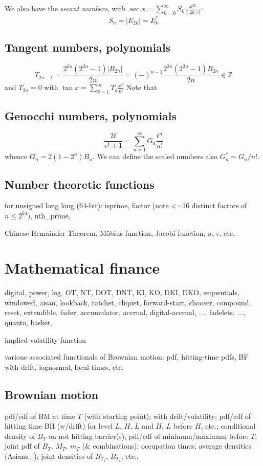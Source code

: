 \documentclass[10pt,dvipdfmx,letterpaper,twoside]{article}
\newcommand{\ZZ}{{\mathbb{Z}}}
\let\sig=\sigma
\begin{document}
We also have the {\em secant numbers},
with $\sec x = \sum_{k=0}^\infty S_k \frac{x^{2k}}{(2k)!}$:
\[ S_n = |E_{2k}| = E^*_k \]

\subsection{Tangent numbers, polynomials}

\[ T_{2n-1} = \frac{2^{2n}(2^{2n}-1)|B_{2n}|}{2n} = (-)^{n-1}\frac{2^{2n}(2^{2n}-1)B_{2n}}{2n} \in \ZZ \]
and $T_{2n} = 0$ with $\tan x = \sum_{k=1}^\infty T_k \frac{x^k}{k!}$
Note that

\subsection{Genocchi numbers, polynomials}

\[ \frac{2t}{e^t+1} = \sum_{n=1}^\infty G_n \frac{t^n}{n!} \]
whence $G_n = 2(1-2^n) B_n$.  We can define the scaled numbers also $G_n^* = G_n/n!$.


\subsection{Number theoretic functions}

for unsigned long long (64-bit): isprime, factor (note <=16 distinct factors of $n\leq2^{64}$), nth\_prime, 

Chinese Remainder Theorem, M\"obius function, Jacobi function, $\sig$, $\tau$, etc.


\section{Mathematical finance}

digital, power, log,
OT, NT, DOT, DNT, KI, KO, DKI, DKO, sequentials, windowed,
aisan, lookback, ratchet, cliquet,
forward-start, chooser, compound, reset, extendible,
fader, accumulator, accrual, digital-accrual, ..., fadelets, ...,
quanto, basket,


implied-volatility function

various associated functionals of Brownian motion: pdf, hitting-time pdfs, BF with drift,
lognormal, local-times, etc.

\subsection{Brownian motion}
pdf/cdf of BM at time $T$ (with starting point); with drift/volatility;
pdf/cdf of hitting time BH (w/drift) for level $L$, $H$, $L$ and $H$, $L$ before $H$, etc.;
conditional density of $B_T$ on not hitting barrier(s);
pdf/cdf of minimum/maximum before $T$;
joint pdf of $B_T$, $M_T$, $m_T$ (\& combinations);
occupation times;
average densities (Asians...);
joint densities of $B_{T_1}$, $B_{T_2}$, etc.;
\end{document}
